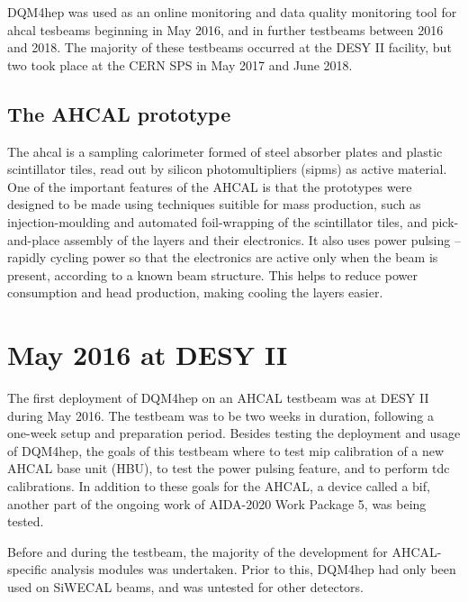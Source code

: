 DQM4hep was used as an online monitoring and data quality monitoring tool for \acrshort{ahcal} tesbeams beginning in May 2016, and in further testbeams between 2016 and 2018. The majority of these testbeams occurred at the DESY II facility, but two took place at the CERN SPS in May 2017 and June 2018.

\subsection*{The AHCAL prototype} %
The \acrfull{ahcal} is a sampling calorimeter formed of steel absorber plates and plastic scintillator tiles, read out by silicon photomultipliers (\acrshort{sipm}s) as active material\cite{proceedings-ahcal-prototype}. One of the important features of the AHCAL is that the prototypes were designed to be made using techniques suitible for mass production, such as injection-moulding and automated foil-wrapping of the scintillator tiles, and pick-and-place assembly of the layers and their electronics. It also uses power pulsing -- rapidly cycling power so that the electronics are active only when the beam is present, according to a known beam structure. This helps to reduce power consumption and head production, making cooling the layers easier.

\section{May 2016 at DESY II}
The first deployment of DQM4hep on an AHCAL testbeam was at DESY II during May 2016. The testbeam was to be two weeks in duration, following a one-week setup and preparation period. Besides testing the deployment and usage of DQM4hep, the goals of this testbeam where to test \acrshort{mip} calibration of a new AHCAL base unit (HBU), to test the power pulsing feature, and to perform \acrshort{tdc} calibrations. In addition to these goals for the AHCAL, a device called a \acrfull{bif}, another part of the ongoing work of AIDA-2020 Work Package 5, was being tested. %

Before and during the testbeam, the majority of the development for AHCAL-specific analysis modules was undertaken. Prior to this, DQM4hep had only been used on SiWECAL beams, and was untested for other detectors. 

